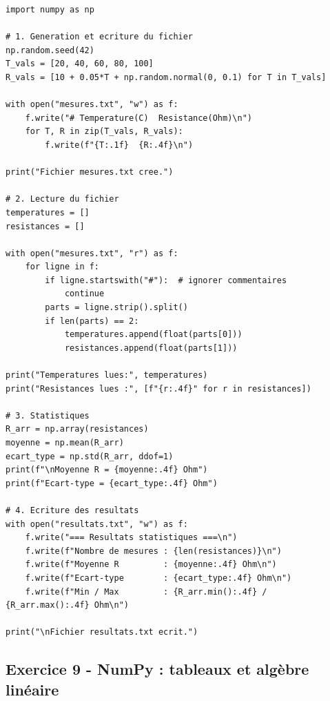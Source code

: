 \documentclass[12pt,a4paper]{article}
\begin{document}
\begin{boitecorrige}
\begin{lstlisting}
import numpy as np

# 1. Generation et ecriture du fichier
np.random.seed(42)
T_vals = [20, 40, 60, 80, 100]
R_vals = [10 + 0.05*T + np.random.normal(0, 0.1) for T in T_vals]

with open("mesures.txt", "w") as f:
    f.write("# Temperature(C)  Resistance(Ohm)\n")
    for T, R in zip(T_vals, R_vals):
        f.write(f"{T:.1f}  {R:.4f}\n")

print("Fichier mesures.txt cree.")

# 2. Lecture du fichier
temperatures = []
resistances = []

with open("mesures.txt", "r") as f:
    for ligne in f:
        if ligne.startswith("#"):  # ignorer commentaires
            continue
        parts = ligne.strip().split()
        if len(parts) == 2:
            temperatures.append(float(parts[0]))
            resistances.append(float(parts[1]))

print("Temperatures lues:", temperatures)
print("Resistances lues :", [f"{r:.4f}" for r in resistances])

# 3. Statistiques
R_arr = np.array(resistances)
moyenne = np.mean(R_arr)
ecart_type = np.std(R_arr, ddof=1)
print(f"\nMoyenne R = {moyenne:.4f} Ohm")
print(f"Ecart-type = {ecart_type:.4f} Ohm")

# 4. Ecriture des resultats
with open("resultats.txt", "w") as f:
    f.write("=== Resultats statistiques ===\n")
    f.write(f"Nombre de mesures : {len(resistances)}\n")
    f.write(f"Moyenne R         : {moyenne:.4f} Ohm\n")
    f.write(f"Ecart-type        : {ecart_type:.4f} Ohm\n")
    f.write(f"Min / Max         : {R_arr.min():.4f} / {R_arr.max():.4f} Ohm\n")

print("\nFichier resultats.txt ecrit.")
\end{lstlisting}
\end{boitecorrige}

\subsection*{Exercice 9 - NumPy : tableaux et algèbre linéaire \niveau{\moyen}}
\end{document}
